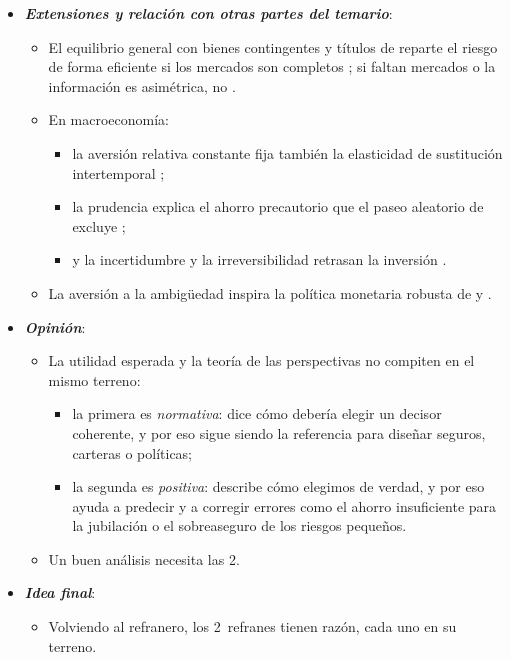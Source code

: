 \documentclass[11pt]{article}
\begin{document}
\begin{itemize}
\begin{itemize}
\begin{itemize}
  \end{itemize}
  Y justifica la regulación que protege a quien no puede diversificar, como los seguros obligatorios o la garantía de depósitos (anexo~\ref{anexo:diamond-dybvig}), que en España gestiona el Fondo de Garantía de Depósitos de Entidades de Crédito . Sus críticas son el origen de la economía conductual .
  \end{itemize}
\item \textbf{\emph{Extensiones y relación con otras partes del temario}}:
  \begin{itemize}
  \item El equilibrio general con bienes contingentes y títulos de  reparte el riesgo de forma eficiente si los mercados son completos ; si faltan mercados o la información es asimétrica, no .
  \item En macroeconomía:
    \begin{itemize}
    \item la aversión relativa constante fija también la elasticidad de sustitución intertemporal ;
    \item la prudencia explica el ahorro precautorio que el paseo aleatorio de  excluye ;
    \item y la incertidumbre y la irreversibilidad retrasan la inversión .
    \end{itemize}
  \item La aversión a la ambigüedad inspira la política monetaria robusta de  y .
  \end{itemize}
\item \textbf{\emph{Opinión}}:
  \begin{itemize}
  \item La utilidad esperada y la teoría de las perspectivas no compiten en el mismo terreno:
    \begin{itemize}
    \item la primera es \emph{normativa}: dice cómo debería elegir un decisor coherente, y por eso sigue siendo la referencia para diseñar seguros, carteras o políticas;
    \item la segunda es \emph{positiva}: describe cómo elegimos de verdad, y por eso ayuda a predecir y a corregir errores como el ahorro insuficiente para la jubilación o el sobreaseguro de los riesgos pequeños.
    \end{itemize}
  \item Un buen análisis necesita las 2.
  \end{itemize}
\item \textbf{\emph{Idea final}}:
  \begin{itemize}
  \item Volviendo al refranero, los 2~refranes tienen razón, cada uno en su terreno.


\end{itemize}
\end{itemize}
\end{document}

